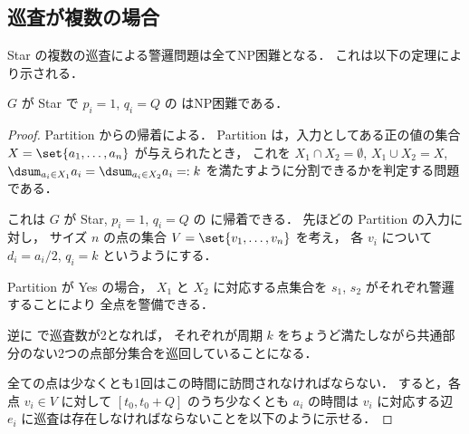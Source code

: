 \subsection{巡査が複数の場合}
Star の複数の巡査による警邏問題は全てNP困難となる．
これは以下の定理により示される．

\begin{theo}
	$G$ が Star で $p_i = 1$, $q_i = Q$ の \minpatroller はNP困難である．
	\label{theo:minpatroller_Star_NPhard}
\end{theo}

\begin{proof}
Partition からの帰着による．
Partition は，入力としてある正の値の集合
$X = \set{ a_1, \ldots, a_n }$ が与えられたとき，
これを
$X_1 \cap X_2 = \emptyset$, $X_1 \cup X_2 = X$,
$\dsum_{a_i \in X_1} a_i = \dsum_{a_i \in X_2} a_i =: k$
を満たすように分割できるかを判定する問題である．

これは $G$ が Star, $p_i = 1$, $q_i = Q$ の \minpatroller に帰着できる．
先ほどの Partition の入力に対し，
サイズ $n$ の点の集合 $V = \set{ v_1, \ldots, v_n }$ を考え，
各 $v_i$ について $d_i = a_i / 2$, $q_i = k$ というようにする．

Partition が Yes の場合，
$X_1$ と $X_2$ に対応する点集合を $s_1$, $s_2$ がそれぞれ警邏することにより
全点を警備できる．

逆に \minpatroller で巡査数が2となれば，
それぞれが周期 $k$ をちょうど満たしながら共通部分のない2つの点部分集合を巡回していることになる．

全ての点は少なくとも1回はこの時間に訪問されなければならない．
すると，各点 $v_i \in V$ に対して
$[t_0, t_0 + Q]$ のうち少なくとも $a_i$ の時間は
$v_i$ に対応する辺 $e_i$ に巡査は存在しなければならないことを以下のように示せる．


\end{proof}
